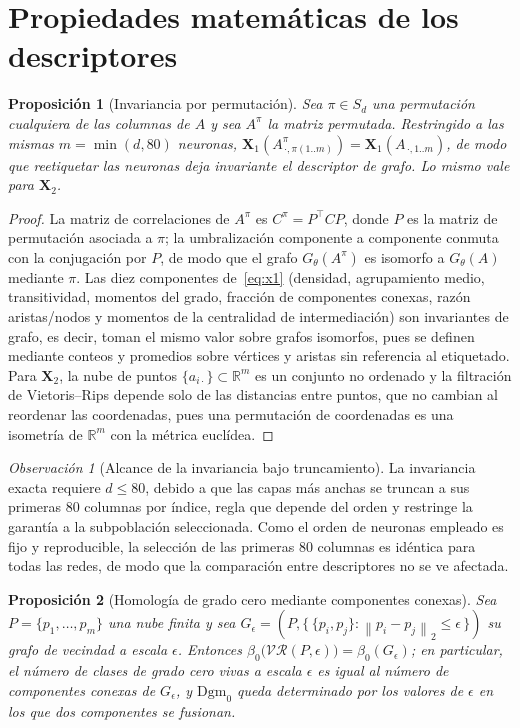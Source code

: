 \documentclass[11pt,a4paper]{article}
\theoremstyle{plain}
\newtheorem{proposition}{Proposición}
\theoremstyle{remark}
\newtheorem{remark}{Observación}
\newcommand{\X}[1]{\mathbf{X}_{#1}}
\newcommand{\Dgm}[1]{\mathrm{Dgm}_{#1}}
\newcommand{\norm}[1]{\left\lVert#1\right\rVert}
\newcommand{\R}{\mathbb{R}}
\begin{document}
\section{Propiedades matemáticas de los descriptores}
\label{sec:prop}

\begin{proposition}[Invariancia por permutación]
\label{prop:invariance}
Sea $\pi \in S_d$ una permutación cualquiera de las columnas de $A$ y sea $A^\pi$ la matriz permutada. Restringido a las mismas $m=\min(d,80)$ neuronas, $\X{1}(A^\pi_{\,\cdot,\pi(1..m)}) = \X{1}(A_{\,\cdot,1..m})$, de modo que reetiquetar las neuronas deja invariante el descriptor de grafo. Lo mismo vale para $\X{2}$.
\end{proposition}

\begin{proof}
La matriz de correlaciones de $A^\pi$ es $C^\pi = P^\top C P$, donde $P$ es la matriz de permutación asociada a $\pi$; la umbralización componente a componente conmuta con la conjugación por $P$, de modo que el grafo $G_\theta(A^\pi)$ es isomorfo a $G_\theta(A)$ mediante $\pi$. Las diez componentes de~\eqref{eq:x1} (densidad, agrupamiento medio, transitividad, momentos del grado, fracción de componentes conexas, razón aristas/nodos y momentos de la centralidad de intermediación) son invariantes de grafo, es decir, toman el mismo valor sobre grafos isomorfos, pues se definen mediante conteos y promedios sobre vértices y aristas sin referencia al etiquetado. Para $\X{2}$, la nube de puntos $\{a_{i\cdot}\}\subset\R^m$ es un conjunto no ordenado y la filtración de Vietoris--Rips depende solo de las distancias entre puntos, que no cambian al reordenar las coordenadas, pues una permutación de coordenadas es una isometría de $\R^m$ con la métrica euclídea.
\end{proof}

\begin{remark}[Alcance de la invariancia bajo truncamiento]
La invariancia exacta requiere $d\le 80$, debido a que las capas más anchas se truncan a sus primeras 80 columnas por índice, regla que depende del orden y restringe la garantía a la subpoblación seleccionada. Como el orden de neuronas empleado es fijo y reproducible, la selección de las primeras 80 columnas es idéntica para todas las redes, de modo que la comparación entre descriptores no se ve afectada.
\end{remark}

\begin{proposition}[Homología de grado cero mediante componentes conexas]
\label{prop:h0}
Sea $P=\{p_1,\dots,p_m\}$ una nube finita y sea $G_\epsilon = (P, \{\,\{p_i,p_j\} : \norm{p_i-p_j}_2 \le \epsilon\,\})$ su grafo de vecindad a escala $\epsilon$. Entonces $\beta_0\bigl(\mathcal{VR}(P,\epsilon)\bigr) = \beta_0(G_\epsilon)$; en particular, el número de clases de grado cero vivas a escala $\epsilon$ es igual al número de componentes conexas de $G_\epsilon$, y $\Dgm{0}$ queda determinado por los valores de $\epsilon$ en los que dos componentes se fusionan.
\end{proposition}
\end{document}
